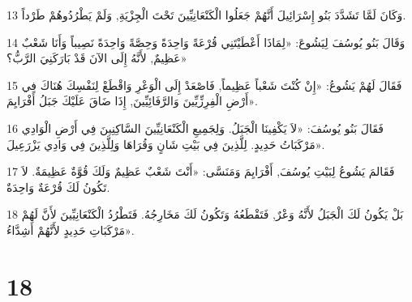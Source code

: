 \par 13 وَكَانَ لَمَّا تَشَدَّدَ بَنُو إِسْرَائِيلَ أَنَّهُمْ جَعَلُوا الْكَنْعَانِيِّينَ تَحْتَ الْجِزْيَةِ, وَلَمْ يَطْرُدُوهُمْ طَرْداً.
\par 14 وَقَالَ بَنُو يُوسُفَ لِيَشُوعَ: «لِمَاذَا أَعْطَيْتَنِي قُرْعَةً وَاحِدَةً وَحِصَّةً وَاحِدَةً نَصِيباً وَأَنَا شَعْبٌ عَظِيمٌ, لأَنَّهُ إِلَى الآنَ قَدْ بَارَكَنِيَ الرَّبُّ؟»
\par 15 فَقَالَ لَهُمْ يَشُوعُ: «إِنْ كُنْتَ شَعْباً عَظِيماً, فَاصْعَدْ إِلَى الْوَعْرِ وَاقْطَعْ لِنَفْسِكَ هُنَاكَ فِي أَرْضِ الْفِرِزِّيِّينَ وَالرَّفَائِيِّينَ, إِذَا ضَاقَ عَلَيْكَ جَبَلُ أَفْرَايِمَ».
\par 16 فَقَالَ بَنُو يُوسُفَ: «لاَ يَكْفِينَا الْجَبَلُ. وَلِجَمِيعِ الْكَنْعَانِيِّينَ السَّاكِنِينَ فِي أَرْضِ الْوَادِي مَرْكَبَاتُ حَدِيدٍ. لِلَّذِينَ فِي بَيْتِ شَانٍ وَقُرَاهَا وَلِلَّذِينَ فِي وَادِي يَزْرَعِيلَ».
\par 17 فَقَالمَ يَشُوعُ لِبَيْتِ يُوسُفَ, أَفْرَايِمَ وَمَنَسَّى: «أَنْتَ شَعْبٌ عَظِيمٌ وَلَكَ قُوَّةٌ عَظِيمَةٌ. لاَ تَكُونُ لَكَ قُرْعَةٌ وَاحِدَةٌ.
\par 18 بَلْ يَكُونُ لَكَ الْجَبَلُ لأَنَّهُ وَعْرٌ, فَتَقْطَعُهُ وَتَكُونُ لَكَ مَخَارِجُهُ. فَتَطْرُدُ الْكَنْعَانِيِّينَ لأَنَّ لَهُمْ مَرْكَبَاتِ حَدِيدٍ لأَنَّهُمْ أَشِدَّاءُ».

\chapter{18}

